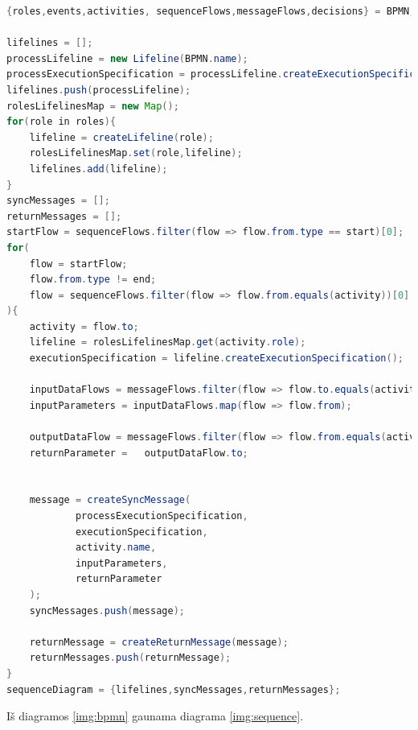 \documentclass{VUMIFInfBakalaurinis}
\begin{document}
\begin{lstlisting}[language=java, caption={\textbf{UML} \textbf{Sekų diagramos} gavimo iš \textbf{BPMN} modelio algoritmo pseudokodas}, label={lst:bpmn_to_sd_algorythm_pseudocode}]
{roles,events,activities, sequenceFlows,messageFlows,decisions} = BPMN;

lifelines = [];
processLifeline = new Lifeline(BPMN.name);
processExecutionSpecification = processLifeline.createExecutionSpecification();
lifelines.push(processLifeline);
rolesLifelinesMap = new Map();
for(role in roles){
	lifeline = createLifeline(role);
	rolesLifelinesMap.set(role,lifeline);
	lifelines.add(lifeline);
}
syncMessages = [];
returnMessages = [];
startFlow = sequenceFlows.filter(flow => flow.from.type == start)[0];
for(
	flow = startFlow;
	flow.from.type != end;
	flow = sequenceFlows.filter(flow => flow.from.equals(activity))[0]
){
	activity = flow.to;
	lifeline = rolesLifelinesMap.get(activity.role);
	executionSpecification = lifeline.createExecutionSpecification();
	
	inputDataFlows = messageFlows.filter(flow => flow.to.equals(activity));
	inputParameters = inputDataFlows.map(flow => flow.from);
	
	outputDataFlow = messageFlows.filter(flow => flow.from.equals(activity))[0];
	returnParameter = 	outputDataFlow.to;
	
	
	message = createSyncMessage(
			processExecutionSpecification,
			executionSpecification,
			activity.name,
			inputParameters,
			returnParameter
	);
	syncMessages.push(message);	
	
	returnMessage = createReturnMessage(message);
	returnMessages.push(returnMessage);	
}
sequenceDiagram = {lifelines,syncMessages,returnMessages};
\end{lstlisting}

Iš diagramos \ref{img:bpmn} gaunama diagrama \ref{img:sequence}.
\end{document}
